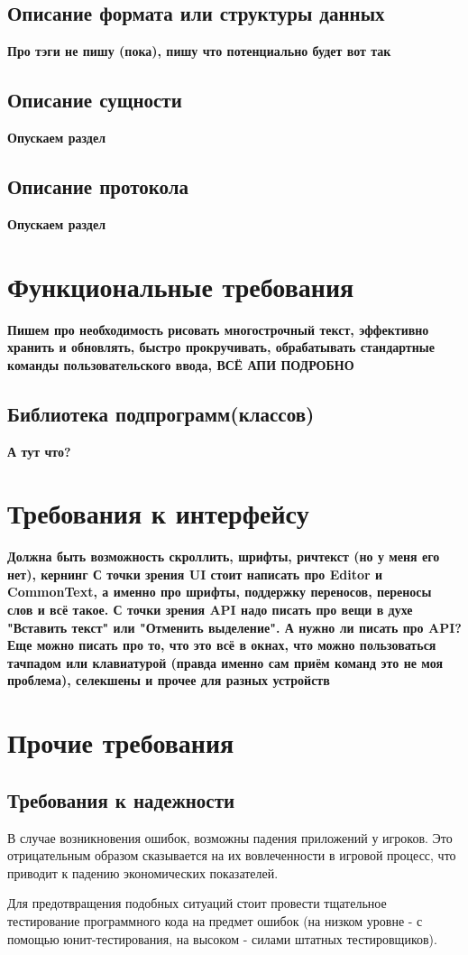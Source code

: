 \documentclass{fefu}
\begin{document}
		\subsection{Описание формата или структуры данных}
			\textbf{Про тэги не пишу (пока), пишу что потенциально будет вот так}
		\subsection{Описание сущности}
			\textbf{Опускаем раздел}
		\subsection{Описание протокола}
			\textbf{Опускаем раздел}
	\section{Функциональные требования}
		\par\textbf{Пишем про необходимость рисовать многострочный текст, эффективно хранить
		и обновлять, быстро прокручивать, обрабатывать стандартные команды пользовательского
		ввода, ВСЁ АПИ ПОДРОБНО }
		\subsection{Библиотека подпрограмм(классов)}
			\textbf{А тут что?}
	\section{Требования к интерфейсу}
		\textbf{Должна быть возможность скроллить, шрифты, ричтекст (но у меня его нет), кернинг
		С точки зрения UI стоит написать про Editor и CommonText, а именно про 
		шрифты, поддержку переносов, переносы слов и всё такое. С точки зрения API надо писать
		про вещи в духе "Вставить текст" или "Отменить выделение". А нужно ли писать про API?
		Еще можно писать про то, что это всё в окнах, что можно пользоваться тачпадом или 
		клавиатурой (правда именно сам приём команд это не моя проблема), селекшены и прочее 
		для разных устройств}
	\section{Прочие требования}
		\subsection{Требования к надежности}
			\par В случае возникновения ошибок, возможны падения приложений у игроков. Это 
			отрицательным образом сказывается на их вовлеченности в игровой процесс, что
			приводит к падению экономических показателей.
			\par Для предотвращения подобных ситуаций стоит провести тщательное тестирование
			программного кода на предмет ошибок (на низком уровне - с помощью 
			юнит-тестирования, на высоком - силами штатных тестировщиков).
\end{document}
